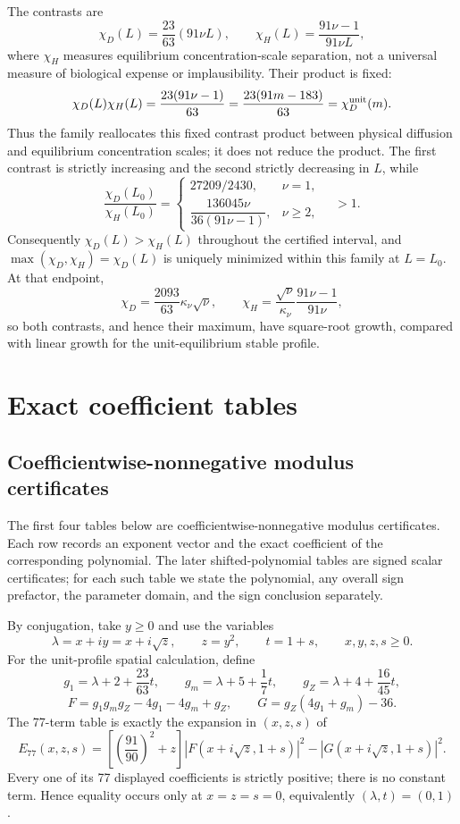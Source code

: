 \documentclass[10pt]{article}
\newcommand{\1}{\mathbf1}
\begin{document}
The contrasts are
\[
 \chi_D(L)=\frac{23}{63}(91\nu L),\qquad
 \chi_H(L)=\frac{91\nu-1}{91\nu L},
\]
where $\chi_H$ measures equilibrium concentration-scale separation, not a
universal measure of biological expense or implausibility.  Their product is
fixed:
\[
 \chi_D(L)\chi_H(L)=\frac{23(91\nu-1)}{63}
 =\frac{23(91m-183)}{63}=\chi_D^{\rm unit}(m).
\]
Thus the family reallocates this fixed contrast product between physical
diffusion and equilibrium concentration scales; it does not reduce the
product.  The first contrast is strictly increasing and the second strictly
decreasing in $L$, while
\[
 \frac{\chi_D(L_0)}{\chi_H(L_0)}=
 \begin{cases}
  27209/2430,&\nu=1,\\[2pt]
  \dfrac{136045\nu}{36(91\nu-1)},&\nu\ge2,
 \end{cases}
 \quad >1.
\]
Consequently $\chi_D(L)>\chi_H(L)$ throughout the certified interval, and
$\max(\chi_D,\chi_H)=\chi_D(L)$ is uniquely minimized within this family at
$L=L_0$.  At that endpoint,
\[
 \chi_D=\frac{2093}{63}\kappa_\nu\sqrt\nu,
 \qquad
 \chi_H=\frac{\sqrt\nu}{\kappa_\nu}\frac{91\nu-1}{91\nu},
\]
so both contrasts, and hence their maximum, have square-root growth, compared
with linear growth for the unit-equilibrium stable profile.

\section{Exact coefficient tables}\label{sec:coefftables}

\subsection{Coefficientwise-nonnegative modulus certificates}

The first four tables below are coefficientwise-nonnegative modulus
certificates.  Each row records an exponent vector and the exact coefficient
of the corresponding polynomial.  The later shifted-polynomial tables are
signed scalar certificates; for each such table we state the polynomial, any
overall sign prefactor, the parameter domain, and the sign conclusion
separately.

By conjugation, take $y\ge0$ and use the variables
\[
 \lambda=x+i y=x+i\sqrt z,\qquad z=y^2,\qquad t=1+s,
 \qquad x,y,z,s\ge0.
\]
For the unit-profile spatial calculation, define
\[
 g_1=\lambda+2+\frac{23}{63}t,\qquad
 g_m=\lambda+5+\frac17t,\qquad
 g_Z=\lambda+4+\frac{16}{45}t,
\]
\[
 F=g_1g_mg_Z-4g_1-4g_m+g_Z,
 \qquad G=g_Z(4g_1+g_m)-36.
\]
The 77-term table is exactly the expansion in $(x,z,s)$ of
\[
 E_{77}(x,z,s)=
 \left[\left(\frac{91}{90}\right)^2+z\right]
 \left|F(x+i\sqrt z,1+s)\right|^2
 -\left|G(x+i\sqrt z,1+s)\right|^2.
\]
Every one of its 77 displayed coefficients is strictly positive; there is no
constant term.  Hence equality occurs only at $x=z=s=0$, equivalently
$(\lambda,t)=(0,1)$.
\end{document}

